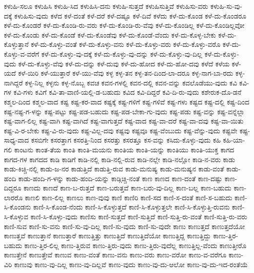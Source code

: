 {ಕಳುಹಿ-ಸಲೂ
ಕಳುಹಿಸಿ
ಕಳುಹಿ-ಸಿದ
ಕಳುಹಿಸಿ-ದನು
ಕಳುಹಿ-ಸುತ್ತದೆ
ಕಳುಹಿಸುತ್ತಿವೆ
ಕಳುಹಿಸು-ವರು
ಕಳುಹಿ-ಸು-ವು-ದಕ್ಕೆ
ಕಳುಹಿಸು-ವುದು
ಕಳೆದ
ಕಳೆ-ದಂತೆ
ಕಳೆ-ದರೆ
ಕಳೆ-ದಷ್ಟೂ
ಕಳೆ-ದಿವೆ
ಕಳೆದು
ಕಳೆ-ದು-ಕೊಂಡ
ಕಳೆ-ದು-ಕೊಂಡರೂ
ಕಳೆ-ದು-ಕೊಂಡರೆ
ಕಳೆ-ದು-ಕೊಂಡಿ-ರು-ವರು
ಕಳೆ-ದು-ಕೊಂಡಿ-ರು-ವೆವು
ಕಳೆ-ದು-ಕೊಂಡಿಲ್ಲ
ಕಳೆ-ದು-ಕೊಂಡಿಲ್ಲವೋ
ಕಳೆ-ದು-ಕೊಂಡು
ಕಳೆ-ದು-ಕೊಂಡೆ
ಕಳೆ-ದು-ಕೊಂಡೆವು
ಕಳೆ-ದು-ಕೊಂಡೆ-ವೆಂದು
ಕಳೆ-ದು-ಕೊಳ್ಳ-ಬೇಕು
ಕಳೆ-ದು-ಕೊಳ್ಳುತ್ತಾನೆ
ಕಳೆ-ದು-ಕೊಳ್ಳು-ವಂತೆ
ಕಳೆ-ದು-ಕೊಳ್ಳು-ವನು
ಕಳೆ-ದು-ಕೊಳ್ಳು-ವರು
ಕಳೆ-ದು-ಕೊಳ್ಳು-ವರೊ
ಕಳೆ-ದು-ಕೊಳ್ಳು-ವ-ವರೆಗೆ
ಕಳೆ-ದು-ಕೊಳ್ಳು-ವು-ದಕ್ಕೆ
ಕಳೆ-ದು-ಕೊಳ್ಳು-ವು-ದನ್ನು
ಕಳೆ-ದು-ಕೊಳ್ಳು-ವು-ದಿಲ್ಲ
ಕಳೆ-ದು-ಕೊಳ್ಳು-ವುದು
ಕಳೆ-ದು-ಕೊಳ್ಳು-ವೆವು
ಕಳೆ-ದು-ದನ್ನು
ಕಳೆ-ದುವು
ಕಳೆ-ದು-ಹೋದ
ಕಳೆ-ದು-ಹೋ-ದವು
ಕಳೆದೆ
ಕಳೆಯ
ಕಳೆ-ಯದೆ
ಕಳೆ-ಯಿರಿ
ಕಳೆ-ಯುತ್ತಾರೆ
ಕಳೆ-ಯು-ವೆವು
ಕಳ್ಳ
ಕಳ್ಳ-ತನ
ಕಳ್ಳ-ತನ-ದಿಂದ-ಲಾ-ದರೂ
ಕಳ್ಳ-ನಾಗ-ಬಾ-ರದು
ಕಳ್ಳ-ನಾಗಿದ್ದರೆ
ಕಳ್ಳ-ನಿಲ್ಲ
ಕಳ್ಳನು
ಕಳ್ಳ-ನೊಬ್ಬ
ಕವಚ
ಕವನ-ಗಳಲ್ಲಿ
ಕವನ-ದಲ್ಲಿ
ಕವನ-ವನ್ನು
ಕವಲೊಡೆಯು-ವುದು
ಕವಿ
ಕವಿ-ಗಳ
ಕವಿ-ಗಳು
ಕವಿಗೆ
ಕವಿ-ತಾ-ವಾಣಿ-ಯಲ್ಲಿ-ಡ-ಬಹುದು
ಕವಿದ
ಕವಿ-ದಿದ್ದರೆ
ಕವಿ-ದಿ-ರು-ವುದು
ಕಶೇರುಕ-ದೊ-ಡನೆ
ಕಶ್ಮಲ-ದಿಂದ
ಕಶ್ಮಲ-ವಾದ
ಕಷ್ಟ
ಕಷ್ಟ-ಕರ-ವಾದ
ಕಷ್ಟಕ್ಕೆ
ಕಷ್ಟ-ಗಳಿಗೆ
ಕಷ್ಟ-ಗಳಿವೆ
ಕಷ್ಟ-ಗಳು
ಕಷ್ಟದ
ಕಷ್ಟ-ದಲ್ಲಿ
ಕಷ್ಟ-ದಿಂದ
ಕಷ್ಟ-ನಷ್ಟ-ಗ-ಳನ್ನು
ಕಷ್ಟ-ಪಟ್ಟು
ಕಷ್ಟ-ಪಡ-ಬಹುದು
ಕಷ್ಟ-ಪಡ-ಬೇಕಾ-ಗು-ವುದು
ಕಷ್ಟ-ಪಡು
ಕಷ್ಟ-ವನ್ನು
ಕಷ್ಟ-ವನ್ನೆಲ್ಲಾ
ಕಷ್ಟ-ವಾಗ-ಲಿಲ್ಲ
ಕಷ್ಟ-ವಾಗಿ
ಕಷ್ಟ-ವಾಗಿದೆ
ಕಷ್ಟ-ವಾಗುತ್ತದೆ
ಕಷ್ಟ-ವಾದ
ಕಷ್ಟ-ವಾ-ದರೆ
ಕಷ್ಟ-ವಾ-ದವು
ಕಷ್ಟ-ವಾ-ಯಿತು
ಕಷ್ಟ-ವಿ-ರ-ಬೇಕು
ಕಷ್ಟ-ವಿ-ರು-ವುದು
ಕಷ್ಟ-ವಿಲ್ಲ-ದವು
ಕಷ್ಟವು
ಕಷ್ಟವೂ
ಕಷ್ಟ-ವೆಂಬುದು
ಕಷ್ಟ-ವೆನ್ನು-ವುದು
ಕಷ್ಟವೇ
ಕಷ್ಟ-ಸಾಧ್ಯ-ವಾದ
ಕಸಬಿಗೇ
ಕಸರತ್ತಾಗ
ಕಸರತ್ತಿ-ನಿಂದ
ಕಸರತ್ತು
ಕಸರತ್ತೂ
ಕಸ-ವನ್ನು
ಕಸಿದು-ಕೊಳ್ಳು-ವುದು
ಕಹಿ
ಕಹಿ-ಯಾ-ಗಲಿ
ಕಾಂಟನು
ಕಾಂತ-ತೆಯ
ಕಾಂತಿ
ಕಾಂತಿ-ಮಯನು
ಕಾಂತಿಯ
ಕಾಂತಿ-ಯನ್ನು
ಕಾಂತಿಯು
ಕಾಂತಿ-ಯುಕ್ತ
ಕಾಗದ
ಕಾಗದ-ಗಳ
ಕಾಗದದ
ಕಾಡಿ
ಕಾಡಿಗೆ
ಕಾಡಿ-ನಲ್ಲಿ
ಕಾಡಿ-ನಲ್ಲಿ-ರುವ
ಕಾಡಿ-ನಲ್ಲೇ
ಕಾಡಿ-ನಲ್ಲೋ
ಕಾಡಿ-ನ-ವರು
ಕಾಡು
ಕಾಡು-ಕಿಚ್ಚಿ-ನಲ್ಲಿ
ಕಾಡು-ಜ-ನರ
ಕಾಡುತ್ತಿದೆ
ಕಾಡುತ್ತಿ-ರುವ
ಕಾಡು-ಮನುಷ್ಯ
ಕಾಡು-ಮನುಷ್ಯನ
ಕಾಡು-ವಂತೆ
ಕಾಡು-ಹಂದಿ
ಕಾಡು-ಹಂದಿ-ಗ-ಳನ್ನು
ಕಾಡು-ಹಂದಿ-ಯನ್ನು
ಕಾಡ್ಗಿಚ್ಚಿ-ನಂತೆ
ಕಾಣ
ಕಾಣದ
ಕಾಣ-ದಂತೆ
ಕಾಣ-ದಷ್ಟು
ಕಾಣ-ದಿದ್ದರೂ
ಕಾಣದು
ಕಾಣದೆ
ಕಾಣ-ಬ-ರುತ್ತದೆ
ಕಾಣ-ಬರುತ್ತವೆ
ಕಾಣ-ಬರು-ವು-ದಿಲ್ಲ
ಕಾಣ-ಬಲ್ಲ
ಕಾಣ-ಬಹುದು
ಕಾಣ-ಲಾರರೊ
ಕಾಣಲಿ
ಕಾಣ-ಲಿಲ್ಲ
ಕಾಣಲು
ಕಾಣ-ವುವು
ಕಾಣಿ
ಕಾಣಿರಿ
ಕಾಣಿ-ಸದ
ಕಾಣಿ-ಸ-ದಂತೆ
ಕಾಣಿ-ಸ-ಬಹುದು
ಕಾಣಿ-ಸಿ-ಕೊಂಡನು
ಕಾಣಿ-ಸಿ-ಕೊಂಡ-ನೆಂದು
ಕಾಣಿ-ಸಿ-ಕೊಳ್ಳುತ್ತದೆ
ಕಾಣಿ-ಸಿ-ಕೊಳ್ಳುತ್ತಲೇ
ಕಾಣಿ-ಸಿ-ಕೊಳ್ಳುತ್ತಿ-ರುವನು
ಕಾಣಿ-ಸಿ-ಕೊಳ್ಳುವ
ಕಾಣಿ-ಸಿ-ಕೊಳ್ಳು-ವುದು
ಕಾಣಿಸು
ಕಾಣಿ-ಸುತ್ತದೆ
ಕಾಣಿ-ಸುತ್ತಿದೆ
ಕಾಣಿ-ಸುತ್ತಿ-ರು-ವಂತೆ
ಕಾಣಿ-ಸುತ್ತಿ-ರು-ವರು
ಕಾಣಿ-ಸುವ
ಕಾಣಿ-ಸು-ವನು
ಕಾಣಿ-ಸು-ವು-ದಿಲ್ಲ
ಕಾಣಿ-ಸು-ವುದು
ಕಾಣಿ-ಸು-ವುದೇ
ಕಾಣು
ಕಾಣುತ್ತದೆ
ಕಾಣುತ್ತದೆಯೋ
ಕಾಣುತ್ತವೆ
ಕಾಣುತ್ತಾನೆ
ಕಾಣುತ್ತಾರೆ
ಕಾಣುತ್ತಿತ್ತು
ಕಾಣುತ್ತಿದೆ
ಕಾಣುತ್ತಿದೆಯೋ
ಕಾಣುತ್ತಿದ್ದ
ಕಾಣುತ್ತಿದ್ದು
ಕಾಣು-ತ್ತಿರ-ಬಹುದು
ಕಾಣು-ತ್ತಿರ-ಲಿಲ್ಲ
ಕಾಣು-ತ್ತಿರುವ
ಕಾಣು-ತ್ತಿರು-ವುದು
ಕಾಣು-ತ್ತಿರು-ವುದೆಲ್ಲ
ಕಾಣುತ್ತಿಲ್ಲ-ವೆಂದು
ಕಾಣುತ್ತೀರೊ
ಕಾಣುತ್ತೇನೆ
ಕಾಣುತ್ತೇವೆ
ಕಾಣುವ
ಕಾಣು-ವಂತೆ
ಕಾಣು-ವನು
ಕಾಣು-ವರು
ಕಾಣು-ವರೋ
ಕಾಣು-ವ-ವರೆಗೂ
ಕಾಣು-ವಿರಿ
ಕಾಣುವು
ಕಾಣು-ವು-ದಿಲ್ಲ
ಕಾಣು-ವು-ದಿಲ್ಲವೆ
ಕಾಣು-ವುದು
ಕಾಣು-ವು-ದು-ಆಲೋ
ಕಾಣು-ವು-ದು-ಇದ-ರಂತೆಯೆ
}
